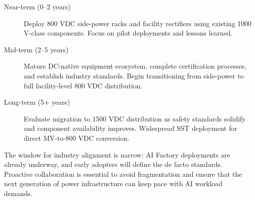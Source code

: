 \begin{description}
\item[Near-term (0--2 years)] Deploy 800 VDC side-power racks and facility rectifiers using existing 1000 V-class components. Focus on pilot deployments and lessons learned.

\item[Mid-term (2--5 years)] Mature DC-native equipment ecosystem, complete certification processes, and establish industry standards. Begin transitioning from side-power to full facility-level 800 VDC distribution.

\item[Long-term (5+ years)] Evaluate migration to 1500 VDC distribution as safety standards solidify and component availability improves. Widespread SST deployment for direct MV-to-800 VDC conversion.
\end{description}

The window for industry alignment is narrow: AI Factory deployments are already underway, and early adopters will define the de facto standards. Proactive collaboration is essential to avoid fragmentation and ensure that the next generation of power infrastructure can keep pace with AI workload demands.
